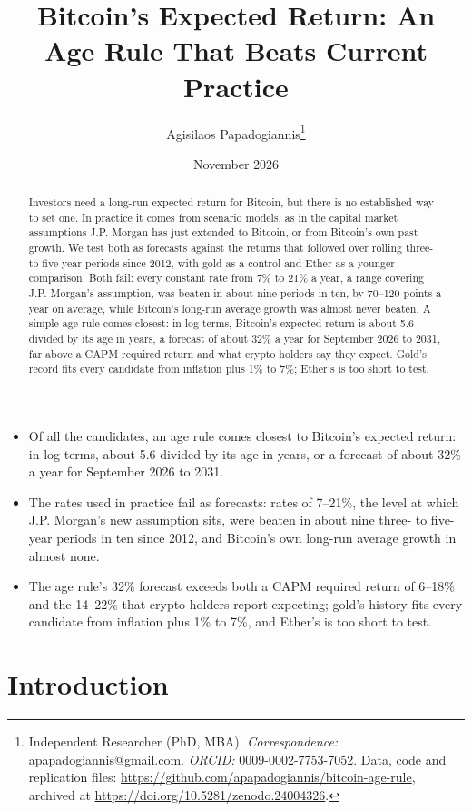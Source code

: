 \documentclass[12pt]{article}
\title{Bitcoin's Expected Return: An Age Rule That Beats Current Practice}
\author{Agisilaos Papadogiannis\thanks{Independent Researcher (PhD, MBA). \textit{Correspondence:} apapadogiannis@gmail.com. \textit{ORCID:} 0009-0002-7753-7052. Data, code and replication files: \url{https://github.com/apapadogiannis/bitcoin-age-rule}, archived at \url{https://doi.org/10.5281/zenodo.24004326}.}}
\date{November 2026}
\theoremstyle{plain}
\theoremstyle{remark}
\begin{document}
\maketitle

\begin{abstract}
\noindent Investors need a long-run expected return for Bitcoin, but there is no established way to set one. In practice it comes from scenario models, as in the capital market assumptions J.P. Morgan has just extended to Bitcoin, or from Bitcoin's own past growth. We test both as forecasts against the returns that followed over rolling three- to five-year periods since 2012, with gold as a control and Ether as a younger comparison. Both fail: every constant rate from 7\% to 21\% a year, a range covering J.P. Morgan's assumption, was beaten in about nine periods in ten, by 70--120 points a year on average, while Bitcoin's long-run average growth was almost never beaten. A simple age rule comes closest: in log terms, Bitcoin's expected return is about 5.6 divided by its age in years, a forecast of about 32\% a year for September 2026 to 2031, far above a CAPM required return and what crypto holders say they expect. Gold's record fits every candidate from inflation plus 1\% to 7\%; Ether's is too short to test.
\end{abstract}

\vspace{-6pt}
\begin{itemize}
\item Of all the candidates, an age rule comes closest to Bitcoin's expected return: in log terms, about 5.6 divided by its age in years, or a forecast of about 32\% a year for September 2026 to 2031.
\item The rates used in practice fail as forecasts: rates of 7--21\%, the level at which J.P. Morgan's new assumption sits, were beaten in about nine three- to five-year periods in ten since 2012, and Bitcoin's own long-run average growth in almost none.
\item The age rule's 32\% forecast exceeds both a CAPM required return of 6--18\% and the 14--22\% that crypto holders report expecting; gold's history fits every candidate from inflation plus 1\% to 7\%, and Ether's is too short to test.
\end{itemize}

\section{Introduction}\label{sec:intro}
\end{document}
